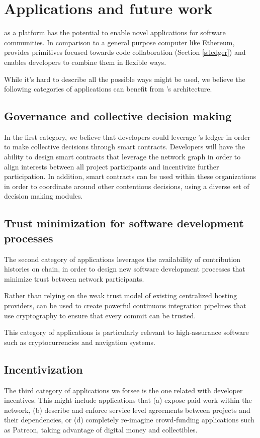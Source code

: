 
\section{Applications and future work}

\oscoin{} as a platform has the potential to enable novel applications for
software communities. In comparison to a general purpose computer like
Ethereum, \oscoin{} provides primitives focused towards code collaboration
(Section \ref{s:ledger}) and enables developers to combine them in flexible ways.

While it’s hard to describe all the possible ways \oscoin{} might be used, we
believe the following categories of applications can benefit from \oscoin{}’s
architecture.

\subsection{Governance and collective decision making}

In the first category, we believe that developers could leverage \oscoin{}’s
ledger in order to make collective decisions through smart contracts. Developers
will have the ability to design smart contracts that leverage the network graph in
order to align interests between all project participants and incentivize further
participation. In addition, smart contracts can be used within these organizations
in order to coordinate around other contentious decisions, using a diverse set of
decision making modules.

\subsection{Trust minimization for software development processes}
The second category of applications leverages the availability of contribution
histories on chain, in order to design new software development processes that
minimize trust between network participants.

Rather than relying on the weak trust model of existing centralized hosting
providers, \oscoin{} can be used to create powerful continuous integration
pipelines that use cryptography to ensure that every commit can be trusted.

This category of applications is particularly relevant to high-assurance
software such as cryptocurrencies and navigation systems.

\subsection{Incentivization}
The third category of applications we forsee is the one related with
developer incentives. This might include applications that (a) expose paid work
within the \oscoin{} network, (b) describe and enforce service level agreements
between projects and their dependencies, or (d) completely re-imagine crowd-funding
applications such as Patreon, taking advantage of digital money and collectibles.

